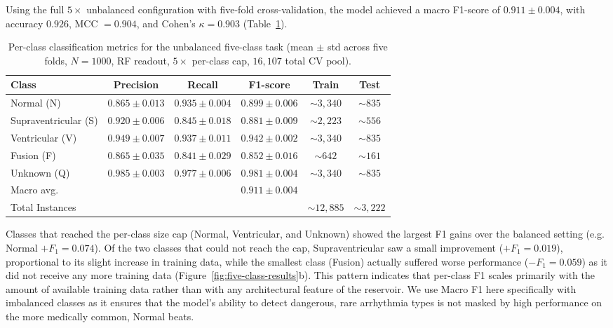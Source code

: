 \documentclass[journal=asbcd6,manuscript=article,keywords]{achemso}
\begin{document}
Using the full $5\times$ unbalanced configuration with five-fold cross-validation, the model achieved a macro F1-score of $0.911 \pm 0.004$, with accuracy $0.926$, MCC $= 0.904$, and Cohen's $\kappa = 0.903$ (Table~\ref{tab:unbalanced-metrics}).

\begin{table}
    \centering
    \caption{Per-class classification metrics for the unbalanced five-class task (mean $\pm$ std across five folds, $N = 1000$, RF readout, $5\times$ per-class cap, $16{,}107$ total CV pool).}
    \label{tab:unbalanced-metrics}
    \small
    \begin{tabular}{lccccc}
        \toprule
        Class & Precision & Recall & F1-score & Train & Test \\
        \midrule
        Normal (N)     & $0.865 \pm 0.013$ & $0.935 \pm 0.004$ & $0.899 \pm 0.006$ & ${\sim}3{,}340$ & ${\sim}835$ \\
        Supraventricular (S) & $0.920 \pm 0.006$ & $0.845 \pm 0.018$ & $0.881 \pm 0.009$ & ${\sim}2{,}223$ & ${\sim}556$ \\
        Ventricular (V) & $0.949 \pm 0.007$ & $0.937 \pm 0.011$ & $0.942 \pm 0.002$ & ${\sim}3{,}340$ & ${\sim}835$ \\
        Fusion (F)     & $0.865 \pm 0.035$ & $0.841 \pm 0.029$ & $0.852 \pm 0.016$ & ${\sim}642$ & ${\sim}161$ \\
        Unknown (Q)    & $0.985 \pm 0.003$ & $0.977 \pm 0.006$ & $0.981 \pm 0.004$ & ${\sim}3{,}340$ & ${\sim}835$ \\
        \midrule
        Macro avg.     &       &        & $0.911 \pm 0.004$ & & \\
        Total Instances  &       &        &                    & ${\sim}12{,}885$ & ${\sim}3{,}222$ \\
        \bottomrule
    \end{tabular}
\end{table}

Classes that reached the per-class size cap (Normal, Ventricular, and Unknown) showed the largest F1 gains over the balanced setting (e.g. Normal $+F_1 = 0.074$). 
Of the two classes that could not reach the cap, Supraventricular saw a small improvement ($+F_1 = 0.019$), proportional to its slight increase in training data, 
while the smallest class (Fusion) actually suffered worse performance ($-F_1 = 0.059$) as it did not receive any more training data (Figure~\ref{fig:five-class-results}b). 
This pattern indicates that per-class F1 scales primarily with the amount of available training data rather than with any architectural feature of the reservoir.
We use Macro F1 here specifically with imbalanced classes as it ensures that the model's ability to detect dangerous, rare arrhythmia types is not masked by high performance on the more medically common, Normal beats.
\end{document}
